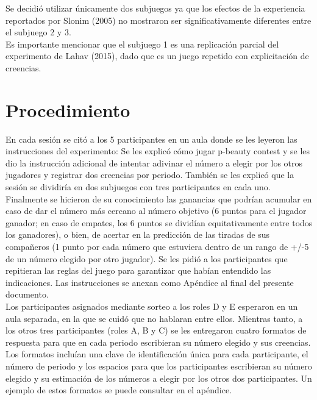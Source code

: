 Se decidió utilizar únicamente dos subjuegos ya que los efectos de la experiencia reportados por Slonim (2005) no mostraron ser significativamente diferentes entre el subjuego 2 y 3.\\

Es importante mencionar que el subjuego 1 es una replicación parcial del experimento de Lahav (2015), dado que es un juego repetido con explicitación de creencias.\\

\section{Procedimiento}

En cada sesión se citó a los 5 participantes en un aula donde se les leyeron las instrucciones del experimento: Se les explicó cómo jugar p-beauty contest y se les dio la instrucción adicional de intentar adivinar el número a elegir por los otros jugadores y registrar dos creencias por periodo. También se les explicó que la sesión se dividiría en dos subjuegos con tres participantes en cada uno. Finalmente se hicieron de su conocimiento las ganancias que podrían acumular en caso de dar el número más cercano al número objetivo (6 puntos para el jugador ganador; en caso de empates, los 6 puntos se dividían equitativamente entre todos los ganadores), o bien, de acertar en la predicción de las tiradas de sus compañeros (1 punto por cada número que estuviera dentro de un rango de +/-5 de un número elegido por otro jugador). Se les pidió a los participantes que repitieran las reglas del juego para garantizar que habían entendido las indicaciones. Las instrucciones se anexan como Apéndice al final del presente documento.\\

Los participantes asignados mediante sorteo a los roles D y E esperaron en un aula separada, en la que se cuidó que no hablaran entre ellos. Mientras tanto, a los otros tres participantes (roles A, B y C) se les entregaron cuatro formatos de respuesta para que en cada periodo escribieran su número elegido y sus creencias. Los formatos incluían una clave de identificación única para cada participante, el número de periodo y los espacios para que los participantes escribieran su número elegido y su estimación de los números a elegir por los otros dos participantes. Un ejemplo de estos formatos se puede consultar en el apéndice.\\

